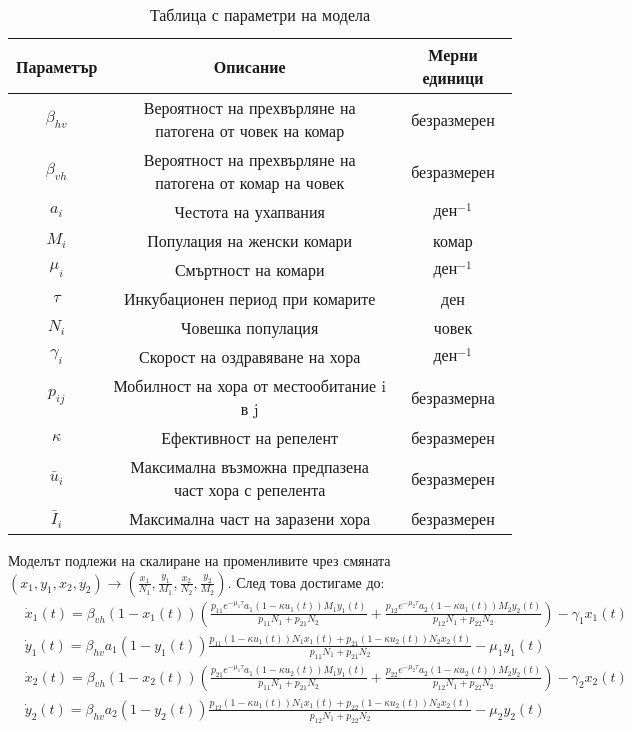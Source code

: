 \begin{table}[h!]
  \centering
  \caption{Таблица с параметри на модела}
  \begin{tabular}{ |c c c|  }
    \hline
    Параметър & Описание & Мерни единици\\
    \hline
    $\beta_{hv}$ & Вероятност на прехвърляне на патогена от човек на комар & безразмерен\\
    $\beta_{vh}$ & Вероятност на прехвърляне на патогена от комар на човек & безразмерен\\
    $a_i$ & Честота на ухапвания & $\text{ден}^{-1}$\\
    $M_i$ & Популация на женски комари & комар\\
    $\mu_i$ & Смъртност на комари & $\text{ден}^{-1}$\\
    $\tau$ & Инкубационен период при комарите & ден\\
    $N_i$ & Човешка популация & човек\\
    $\gamma_i$ & Скорост на оздравяване на хора & $\text{ден}^{-1}$\\
    $p_{ij}$ & Мобилност на хора от местообитание i в j & безразмерна\\
    $\kappa$ & Ефективност на репелент & безразмерен\\
    $\bar{u}_i$ & Максимална възможна предпазена част хора с репелента & безразмерен\\
    $\bar{I}_i$ & Максимална част на заразени хора & безразмерен\\
    \hline
  \end{tabular}
  \label{table:1}
\end{table}

Моделът подлежи на скалиране на променливите чрез смяната $(x_1, y_1, x_2, y_2) \rightarrow (\frac{x_1}{N_1}, \frac{y_1}{M_1}, \frac{x_2}{N_2}, \frac{y_2}{M_2})$. След това достигаме до:
\begin{equation}
  \label{eq:TheDimensionlessProblemFull}
  \begin{split}
    &\dot{x}_1(t) = \beta_{vh} (1-x_1(t)) \left(\frac{p_{11} e^{-\mu_1 \tau} a_1 (1-\kappa u_1(t)) M_1 y_1(t)}{p_{11} N_1 + p_{21} N_2} + \frac{p_{12} e^{-\mu_2 \tau} a_2 (1-\kappa u_1(t)) M_2 y_2(t)}{p_{12} N_1 + p_{22} N_2}\right) - \gamma_1 x_1(t) \\
    &\dot{y}_1(t) = \beta_{hv} a_1 (1-y_1(t)) \frac{p_{11} (1-\kappa u_1(t)) N_1 x_1(t) + p_{21} (1-\kappa u_2(t)) N_2 x_2(t)}{p_{11} N_1 + p_{21} N_2} - \mu_1 y_1(t) \\
    &\dot{x}_2(t) = \beta_{vh} (1-x_2(t)) \left(\frac{p_{21} e^{-\mu_1 \tau} a_1 (1-\kappa u_2(t)) M_1 y_1(t)}{p_{11} N_1 + p_{21} N_2} + \frac{p_{22} e^{-\mu_2 \tau} a_2 (1-\kappa u_2(t)) M_2 y_2(t)}{p_{12} N_1 + p_{22} N_2}\right) - \gamma_2 x_2(t) \\
    &\dot{y}_2(t) = \beta_{hv} a_2 (1-y_2(t)) \frac{p_{12} (1-\kappa u_1(t)) N_1 x_1(t) + p_{22} (1-\kappa u_2(t)) N_2 x_2(t)}{p_{12} N_1 + p_{22} N_2} - \mu_2 y_2(t)
  \end{split}
\end{equation}

